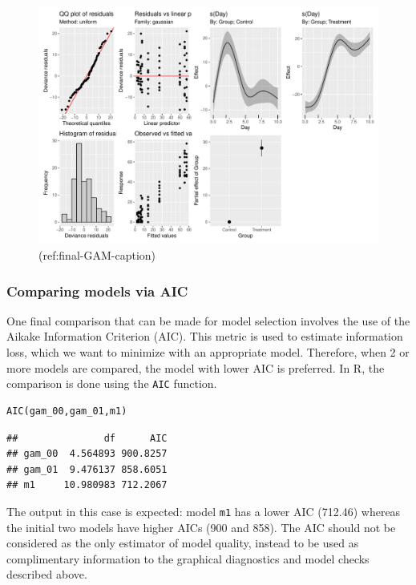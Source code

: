 \documentclass[Royal,times,sagev]{sagej}
\begin{document}
\begin{figure}

{\centering \includegraphics[width=0.75\linewidth]{Full_document_SAGE_files/figure-latex/final-GAM-diag-1} 

}

\caption{(ref:final-GAM-caption)}\label{fig:final-GAM-diag}
\end{figure}

\hypertarget{comparing-models-via-aic}{%
\subsubsection{Comparing models via
AIC}\label{comparing-models-via-aic}}

One final comparison that can be made for model selection involves the
use of the Aikake Information Criterion (AIC). This metric is used to
estimate information loss, which we want to minimize with an appropriate
model. Therefore, when 2 or more models are compared, the model with
lower AIC is preferred. In R, the comparison is done using the
\texttt{AIC} function.

\begin{verbatim}
AIC(gam_00,gam_01,m1)
\end{verbatim}

\begin{verbatim}
##               df      AIC
## gam_00  4.564893 900.8257
## gam_01  9.476137 858.6051
## m1     10.980983 712.2067
\end{verbatim}

The output in this case is expected: model \texttt{m1} has a lower AIC
(712.46) whereas the initial two models have higher AICs (900 and 858).
The AIC should not be considered as the only estimator of model quality,
instead to be used as complimentary information to the graphical
diagnostics and model checks described above.
\end{document}
